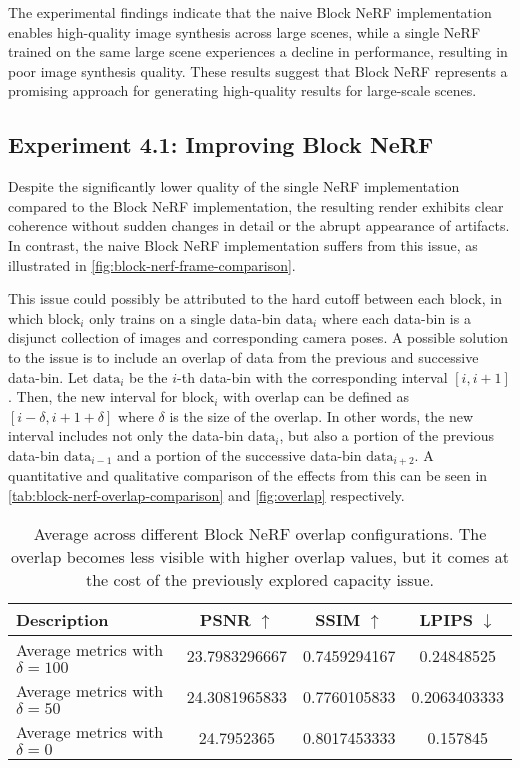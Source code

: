 The experimental findings indicate that the naive Block NeRF implementation enables high-quality image synthesis across large scenes, while a single NeRF trained on the same large scene experiences a decline in performance, resulting in poor image synthesis quality. These results suggest that Block NeRF represents a promising approach for generating high-quality results for large-scale scenes.

\subsection{Experiment 4.1: Improving Block NeRF}
Despite the significantly lower quality of the single NeRF implementation compared to the Block NeRF implementation, the resulting render exhibits clear coherence without sudden changes in detail or the abrupt appearance of artifacts. In contrast, the naive Block NeRF implementation suffers from this issue, as illustrated in \autoref{fig:block-nerf-frame-comparison}.



This issue could possibly be attributed to the hard cutoff between each block, in which $\text{block}_i$ only trains on a single data-bin $\text{data}_i$ where each data-bin is a disjunct collection of images and corresponding camera poses. A possible solution to the issue is to include an overlap of data from the previous and successive data-bin. Let $\text{data}_i$ be the $i$-th data-bin with the corresponding interval $[i, {i+1}]$. Then, the new interval for $\text{block}_i$ with overlap can be defined as $[i - \delta, {i+1} + \delta]$ where $\delta$ is the size of the overlap. In other words, the new interval includes not only the data-bin $\text{data}_i$, but also a portion of the previous data-bin $\text{data}_{i-1}$ and a portion of the successive data-bin $\text{data}_{i+2}$. A quantitative and qualitative comparison of the effects from this can be seen in \autoref{tab:block-nerf-overlap-comparison} and \autoref{fig:overlap} respectively.

\begin{table}[ht]
\centering
\setlength{\tabcolsep}{6pt}
\renewcommand{\arraystretch}{1.5}
\begin{tabular}{l | C{2.2} C{1.3} C{1.3}}
\hline
\textbf{Description} & \textbf{PSNR $\uparrow$} & \textbf{SSIM $\uparrow$} & \textbf{LPIPS $\downarrow$} \\
\hline
Average metrics with $\delta = 100$ &23.7983296667 &0.7459294167 &0.24848525 \\
Average metrics with $\delta = 50$  & 24.3081965833 & 0.7760105833 & 0.2063403333 \\
Average metrics with $\delta = 0$ &24.7952365 &0.8017453333 &0.157845 \\
\hline
\end{tabular}
\caption{Average across different Block NeRF overlap configurations. The overlap becomes less visible with higher overlap values, but it comes at the cost of the previously explored capacity issue.}
\label{tab:block-nerf-overlap-comparison}
\end{table}

